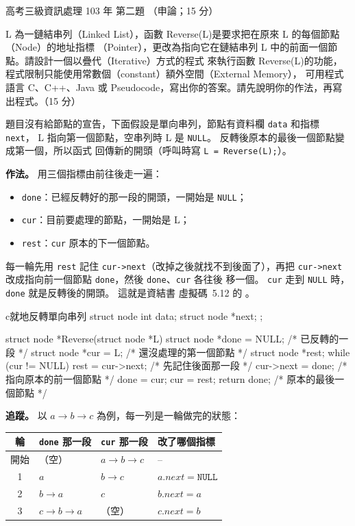 \begin{pastexam}[label={px:gk3-103-ds-02}]{高考三級資訊處理 103 年 第二題}
（申論；15 分）

L 為一鏈結串列（Linked List），函數 Reverse(L)是要求把在原來 L 的每個節點（Node）的地址指標
（Pointer），更改為指向它在鏈結串列 L 中的前面一個節點。請設計一個以疊代（Iterative）方式的程式
來執行函數 Reverse(L)的功能，程式限制只能使用常數個（constant）額外空間（External Memory），
可用程式語言 C、C++、Java 或 Pseudocode，寫出你的答案。請先說明你的作法，再寫出程式。（15 分）
\end{pastexam}

\begin{pastsoln}
題目沒有給節點的宣告，下面假設是單向串列，節點有資料欄 \texttt{data} 和指標 \texttt{next}，
L 指向第一個節點，空串列時 L 是 \texttt{NULL}。 反轉後原本的最後一個節點變成第一個，所以函式
回傳新的開頭（呼叫時寫 \texttt{L = Reverse(L);}）。

\textbf{作法。} 用三個指標由前往後走一遍：
\begin{itemize}
\item \texttt{done}：已經反轉好的那一段的開頭，一開始是 \texttt{NULL}；
\item \texttt{cur}：目前要處理的節點，一開始是 L；
\item \texttt{rest}：\texttt{cur} 原本的下一個節點。
\end{itemize}
每一輪先用 \texttt{rest} 記住 \texttt{cur->next}（改掉之後就找不到後面了），再把
\texttt{cur->next} 改成指向前一個節點 \texttt{done}，然後 \texttt{done}、\texttt{cur} 各往後
移一個。 \texttt{cur} 走到 \texttt{NULL} 時，\texttt{done} 就是反轉後的開頭。 這就是資結書
虛擬碼~5.12 的 。

\begin{code}{c}{就地反轉單向串列}
struct node {
    int data;
    struct node *next;
};

struct node *Reverse(struct node *L)
{
    struct node *done = NULL;   /* 已反轉的一段 */
    struct node *cur = L;       /* 還沒處理的第一個節點 */
    struct node *rest;
    while (cur != NULL) {
        rest = cur->next;       /* 先記住後面那一段 */
        cur->next = done;       /* 指向原本的前一個節點 */
        done = cur;
        cur = rest;
    }
    return done;                /* 原本的最後一個節點 */
}
\end{code}

\textbf{追蹤。} 以 $a \to b \to c$ 為例，每一列是一輪做完的狀態：
\begin{center}
\begin{tabular}{clll}
\toprule
輪 & \texttt{done} 那一段 & \texttt{cur} 那一段 & 改了哪個指標 \\
\midrule
開始 & （空） & $a \to b \to c$ & -- \\
1 & $a$ & $b \to c$ & $a.\mathit{next} = \texttt{NULL}$ \\
2 & $b \to a$ & $c$ & $b.\mathit{next} = a$ \\
3 & $c \to b \to a$ & （空） & $c.\mathit{next} = b$ \\
\bottomrule
\end{tabular}
\end{center}


\end{pastsoln}
